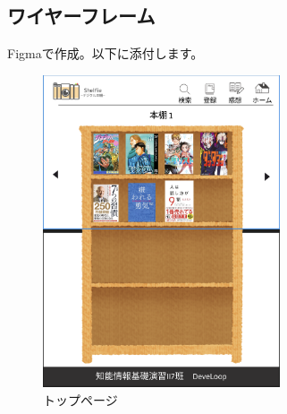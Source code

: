 \documentclass[a4paper, 11pt, titlepage]{jsarticle}
\begin{document}
\subsection{ワイヤーフレーム}
Figmaで作成。以下に添付します。

\begin{figure}[htbp]
\centering
\includegraphics[width=70mm]{toppage.png}
\caption{トップページ}
\label{fig:func}
\end{figure}
\end{document}

